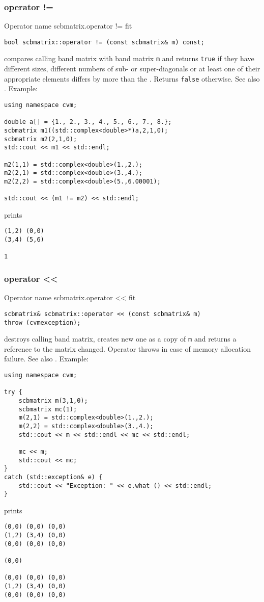 \subsubsection{operator !=}
Operator%
\pdfdest name {scbmatrix.operator !=} fit
\begin{verbatim}
bool scbmatrix::operator != (const scbmatrix& m) const;
\end{verbatim}
compares  calling band matrix with  band matrix \verb"m"
and returns \verb"true" if they have different sizes,
different numbers of sub- or super-diagonals
or at least one of their appropriate elements
differs by more than the
.
Returns \verb"false" otherwise.
See also .
Example:
\begin{Verbatim}
using namespace cvm;

double a[] = {1., 2., 3., 4., 5., 6., 7., 8.};
scbmatrix m1((std::complex<double>*)a,2,1,0);
scbmatrix m2(2,1,0);
std::cout << m1 << std::endl;

m2(1,1) = std::complex<double>(1.,2.); 
m2(2,1) = std::complex<double>(3.,4.); 
m2(2,2) = std::complex<double>(5.,6.00001);

std::cout << (m1 != m2) << std::endl;
\end{Verbatim}
prints
\begin{Verbatim}
(1,2) (0,0)
(3,4) (5,6)

1
\end{Verbatim}
\newpage




\subsubsection{operator <{}<}
Operator%
\pdfdest name {scbmatrix.operator <<} fit
\begin{verbatim}
scbmatrix& scbmatrix::operator << (const scbmatrix& m)
throw (cvmexception);
\end{verbatim}
destroys  calling band matrix, creates  new one as a copy of \verb"m"
and returns a reference to
the matrix changed.
Operator throws  
in case of memory allocation failure.
See also .
Example:
\begin{Verbatim}
using namespace cvm;

try {
    scbmatrix m(3,1,0);
    scbmatrix mc(1);
    m(2,1) = std::complex<double>(1.,2.);
    m(2,2) = std::complex<double>(3.,4.);
    std::cout << m << std::endl << mc << std::endl;

    mc << m;
    std::cout << mc;
}
catch (std::exception& e) {
    std::cout << "Exception: " << e.what () << std::endl;
}
\end{Verbatim}
prints
\begin{Verbatim}
(0,0) (0,0) (0,0)
(1,2) (3,4) (0,0)
(0,0) (0,0) (0,0)

(0,0)

(0,0) (0,0) (0,0)
(1,2) (3,4) (0,0)
(0,0) (0,0) (0,0)
\end{Verbatim}
\newpage



